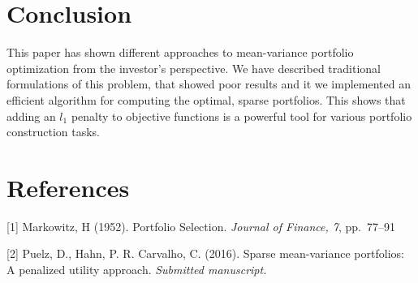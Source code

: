 \documentclass{article}
\begin{document}
\section{Conclusion}
This paper has shown different approaches to mean-variance portfolio optimization from the investor’s perspective. We have described traditional formulations of this problem, that showed poor results and it we implemented an efficient algorithm for computing the optimal, sparse portfolios. This shows that adding an $l_1$ penalty to objective functions is a powerful tool for various portfolio construction tasks. 
\section*{References}
\small

[1] Markowitz, H (1952). Portfolio Selection. {\it Journal of Finance, 7}, pp.\ 77--91

[2] Puelz, D., Hahn, P. R. Carvalho, C. (2016). Sparse mean-variance portfolios: A penalized utility approach. {\it Submitted manuscript.}


\end{document}
